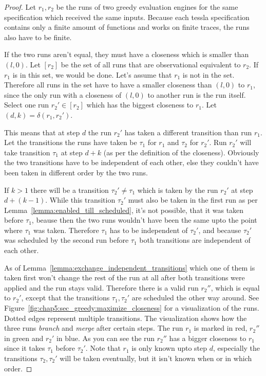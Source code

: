 \begin{proof}\label{proof:equiv_greedy_engines}
  Let \(r_1, r_2\) be the runs of two greedy evaluation engines for the same specification which received the same inputs.
  Because each \gls{tessla} specification contains only a finite amount of functions and works on finite traces, the runs also have to be finite.

  If the two runs aren't equal, they must have a closeness which is smaller than \((l, 0)\).
  Let \([r_2]\) be the set of all runs that are observational equivalent to \(r_2\).
  If \(r_1\) is in this set, we would be done.
  Let's assume that \(r_1\) is not in the set.
  Therefore all runs in the set have to have a smaller closeness than \((l,0)\) to \(r_1\), since the only run with a closeness of \((l,0)\) to another run is the run itself.
  Select one run \(r_2' \in [r_2]\) which has the biggest closeness to \(r_1\).
  Let \((d,k) = \delta(r_1, r_2')\).

  This means that at step \(d\) the run \(r_2'\) has taken a different transition than run \(r_1\).
  Let the transitions the runs have taken be \(\tau_1\) for \(r_1\) and \(\tau_2\) for \(r_2'\).
  Run \(r_2'\) will take transition \(\tau_1\) at step \(d+k\) (as per the definition of the closeness).
  Obviously the two transitions have to be independent of each other, else they couldn't have been taken in different order by the two runs.

  If \(k > 1\) there will be a transition \(\tau_2' \neq \tau_1\) which is taken by the run \(r_2'\) at step \(d+(k-1)\).
  While this transition \(\tau_2'\) must also be taken in the first run as per Lemma~\ref{lemma:enabled_till_scheduled}, it's not possible, that it was taken before \(\tau_1\), beause then the two runs wouldn't have been the same upto the point where \(\tau_1\) was taken.
  Therefore \(\tau_1\) has to be independent of \(\tau_2'\), and because \(\tau_2'\) was scheduled by the second run before \(\tau_1\) both transitions are independent of each other.

  As of Lemma~\ref{lemma:exchange_independent_transitions} which one of them is taken first won't change the rest of the run at all after both transitions were applied and the run stays valid.
  Therefore there is a valid run \(r_2''\), which is equal to \(r_2'\), except that the transitions \(\tau_1, \tau_2'\) are scheduled the other way around.
  See Figure~\ref{fig:chap5:sec_greedy:maximize_closeness} for a visualization of the runs.
  Dotted edges represent multiple transitions. The visualization shows how the three runs \emph{branch} and \emph{merge} after certain steps.
  The run \(r_1\) is marked in red, \(r_2''\) in green and \(r_2'\) in blue.
  As you can see the run \(r_2''\) has a bigger closeness to \(r_1\) since it takes \(\tau_1\) before \(\tau_2'\).
  Note that \(r_1\) is only known upto step \(d\), especially the transitions \(\tau_2, \tau_2'\) will be taken eventually, but it isn't known when or in which order.


\end{proof}

